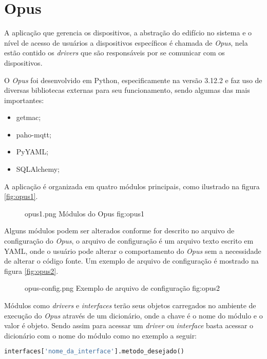 \chapter{\textbf{Opus}}
\label{opus}

A aplicação que gerencia os dispositivos, a abstração do edifício no sistema e o nível de acesso de usuários a dispositivos específicos
é chamada de \emph{Opus}, nela estão contido os \emph{drivers} que são responsáveis por se comunicar com os dispositivos.

O \emph{Opus} foi desenvolvido em Python, especificamente na versão 3.12.2 e faz uso de diversas bibliotecas externas para seu funcionamento,
sendo algumas das mais importantes:
\begin{itemize}
    \item getmac;
    \item paho-mqtt;
    \item PyYAML;
    \item SQLAlchemy;
\end{itemize}

A aplicação é organizada em quatro módulos principais, como ilustrado na figura \ref{fig:opus1}.
\begin{figure}[h!]
    {opus1.png}
    {Módulos do Opus}
    {fig:opus1}
\end{figure}

Alguns módulos podem ser alterados conforme for descrito no arquivo de configuração do \emph{Opus}, o arquivo de configuração é um arquivo texto
escrito em YAML, onde o usuário pode alterar o comportamento do \emph{Opus} sem a necessidade de alterar o código fonte.
Um exemplo de arquivo de configuração é mostrado na figura \ref{fig:opus2}.
\begin{figure}[h!]
    {opus-config.png}
    {Exemplo de arquivo de configuração}
    {fig:opus2}
\end{figure}


Módulos como \emph{drivers} e \emph{interfaces} terão seus objetos carregados no ambiente de execução do \emph{Opus}
através de um dicionário, onde a chave é o nome do módulo e o valor é objeto.
Sendo assim para acessar um \emph{driver} ou \emph{interface} basta acessar o dicionário com o nome do módulo como no exemplo
a seguir:
\begin{lstlisting}[language=Python]
    interfaces['nome_da_interface'].metodo_desejado()
\end{lstlisting}